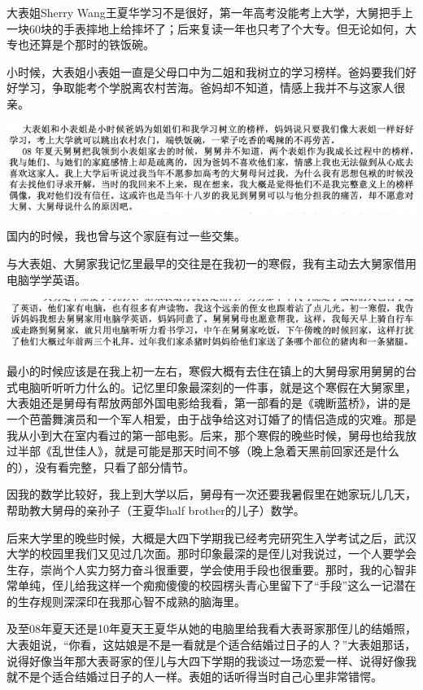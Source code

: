 \documentclass[9pt, b5paper]{article}
\begin{document}
大表姐Sherry Wang王夏华学习不是很好，第一年高考没能考上大学，大舅把手上一块60块的手表摔地上给摔坏了；后来复读一年也只考了个大专。但无论如何，大专也还算是个那时的铁饭碗。

小时候，大表姐小表姐一直是父母口中为二姐和我树立的学习榜样。爸妈要我们好好学习，争取能考个学脱离农村苦海。爸妈却不知道，情感上我并不与这家人很亲。

\begin{center}
\includegraphics[width=.9\linewidth]{./pic/p1p123-3.png}
\end{center}

国内的时候，我也曾与这个家庭有过一些交集。 

与大表姐、大舅家我记忆里最早的交往是在我初一的寒假，我有主动去大舅家借用电脑学学英语。

\begin{center}
\includegraphics[width=.9\linewidth]{./pic/p1p47-2.png}
\end{center}

最小的时候应该是在我上初一左右，寒假大概有去住在镇上的大舅母家用舅舅的台式电脑听听听力什么的。记忆里印象最深刻的一件事，就是这个寒假在大舅家里，大表姐还是舅母有帮放两部外国电影给我看，第一部看的是《魂断蓝桥》，讲的是一个芭蕾舞演员和一个军人相爱，由于战争给这对订婚了的情侣造成的灾难。那是我从小到大在室内看过的第一部电影。后来，那个寒假的晚些时候，舅母也给我放过半部《乱世佳人》，就是可能是那天时间不够（晚上急着天黑前回家还是什么的），没有看完整，只看了部分情节。

因我的数学比较好，我上到大学以后，舅母有一次还要我暑假里在她家玩儿几天，帮助教大舅母的亲孙子（王夏华half brother的儿子）数学。

后来大学里的晚些时候，大概是大四下学期我已经考完研究生入学考试之后，武汉大学的校园里我们又见过几次面。那时印象最深的是侄儿对我说过，一个人要学会生存，崇尚个人实力努力奋斗很重要，学会使用手段也很重要。那时，我的心智非常单纯，侄儿给我这样一个痴痴傻傻的校园楞头青心里留下了“手段”这么一记潜在的生存规则深深印在我那心智不成熟的脑海里。

及至08年夏天还是10年夏天王夏华从她的电脑里给我看大表哥家那侄儿的结婚照，大表姐说，“你看，这姑娘是不是一看就是个适合结婚过日子的人？”大表姐那话，说得好像当年那大表哥家的侄儿与大四下学期的我谈过一场恋爱一样、说得好像我就不是个适合结婚过日子的人一样。表姐的话听得当时自己心里非常错愕。
\end{document}
